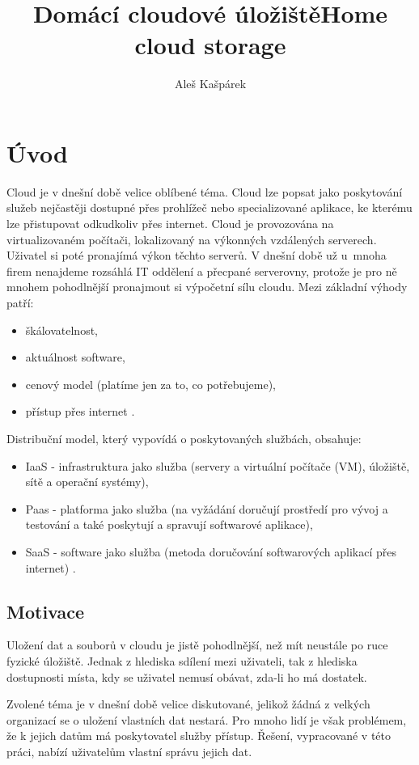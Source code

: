 \documentclass[
  glossaries,
]{kidiplom}
\title{Domácí cloudové úložiště}
\title[english]{Home cloud storage}
\author{Aleš Kašpárek}
\begin{document}
\maketitle

\section{Úvod}
\label{sec:intro}
Cloud je v dnešní době velice oblíbené téma. Cloud lze popsat jako poskytování služeb nejčastěji dostupné přes prohlížeč nebo specializované aplikace, ke kterému lze přistupovat odkudkoliv přes internet. Cloud je provozována na virtualizovaném počítači, lokalizovaný na výkonných vzdálených serverech. Uživatel si poté pronajímá výkon těchto serverů. V dnešní době už u~mnoha firem nenajdeme rozsáhlá IT oddělení a přecpané serverovny, protože je pro ně mnohem pohodlnější pronajmout si výpočetní sílu cloudu. Mezi základní výhody patří:
\begin{itemize}
\item škálovatelnost,
\item aktuálnost software,
\item {} cenový model (platíme jen za to, co potřebujeme),
\item přístup přes internet \cite{WIKI_CLOUD}.
\end{itemize}
Distribuční model, který vypovídá o poskytovaných službách, obsahuje:
\begin{itemize}
\item IaaS - infrastruktura jako služba (servery a virtuální počítače (VM), úložiště, sítě a operační systémy),
\item Paas - platforma jako služba (na vyžádání doručují prostředí pro vývoj a testování a také poskytují a spravují softwarové aplikace),
\item SaaS - software jako služba (metoda doručování softwarových aplikací přes internet) \cite{MS_CLOUD}.
\end{itemize}

\subsection{Motivace}
Uložení dat a souborů v cloudu je jistě pohodlnější, než mít neustále po ruce fyzické úložiště. Jednak z hlediska sdílení mezi uživateli, tak z hlediska dostupnosti místa, kdy se uživatel nemusí obávat, zda-li ho má dostatek. 

Zvolené téma je v dnešní době velice diskutované, jelikož žádná z velkých organizací se o uložení vlastních dat nestará. Pro mnoho lidí je však problémem, že k jejich datům má poskytovatel služby přístup. Řešení, vypracované v této práci, nabízí uživatelům vlastní správu jejich dat.
\end{document}
